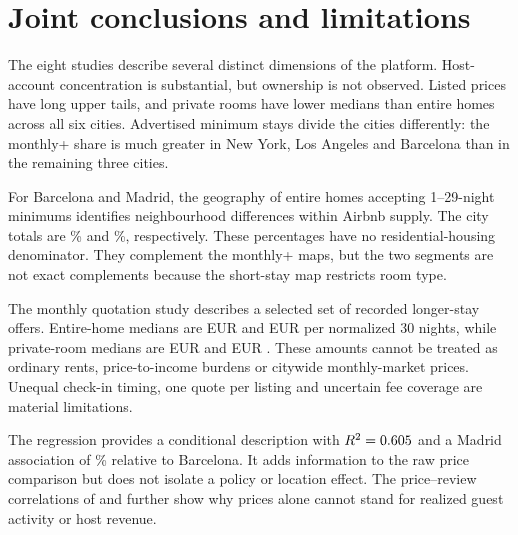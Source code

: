 \documentclass[11pt,a4paper]{article}
\begin{document}
\clearpage
\section{Joint conclusions and limitations}
The eight studies describe several distinct dimensions of the platform. Host-account concentration is substantial, but ownership is not observed. Listed prices have long upper tails, and private rooms have lower medians than entire homes across all six cities. Advertised minimum stays divide the cities differently: the monthly+ share is much greater in New York, Los Angeles and Barcelona than in the remaining three cities.

For Barcelona and Madrid, the geography of entire homes accepting 1--29-night minimums identifies neighbourhood differences within Airbnb supply. The city totals are \BcnShortPct{}\% and \MadShortPct{}\%, respectively. These percentages have no residential-housing denominator. They complement the monthly+ maps, but the two segments are not exact complements because the short-stay map restricts room type.

The monthly quotation study describes a selected set of recorded longer-stay offers. Entire-home medians are EUR \BcnEntireMonthly{} and EUR \MadEntireMonthly{} per normalized 30 nights, while private-room medians are EUR \BcnPrivateMonthly{} and EUR \MadPrivateMonthly{}. These amounts cannot be treated as ordinary rents, price-to-income burdens or citywide monthly-market prices. Unequal check-in timing, one quote per listing and uncertain fee coverage are material limitations.

The regression provides a conditional description with $R^2=0.605{}$ and a Madrid association of \CityPct{}\% relative to Barcelona. It adds information to the raw price comparison but does not isolate a policy or location effect. The price--review correlations of \BcnRho{} and \MadRho{} further show why prices alone cannot stand for realized guest activity or host revenue.
\end{document}
